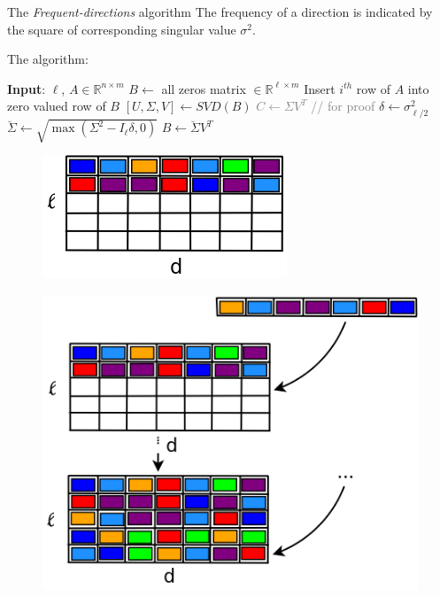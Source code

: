 \documentclass[first=dgreen,second=purple,logo=redque]{aaltoslides}
\begin{document}
\begin{frame}[allowframebreaks=1]{The \textit{Frequent-directions} algorithm}
The \textcolor{dgreen}{frequency} of a direction is indicated by the square of corresponding singular value $\sigma^2$.

\framebreak
The algorithm:
  \begin{algorithmic}
    \State \textbf{Input}: $\ell$, $A \in \mathbb{R}^{n\times m}$
    \State $B \leftarrow $ all zeros matrix $\in \mathbb{R}^{\ell\times m}$
    \State Insert $i^{th}$ row of $A$ into zero valued row of $B$
      \State $[U,\Sigma,V] \leftarrow SVD(B)$
      \textcolor{gray}{\State $C \leftarrow \Sigma V^T$ // for proof}
      \State $\delta \leftarrow \sigma_{\ell/2}^2$
      \State $\breve{\Sigma} \leftarrow \sqrt{\max(\Sigma^2-I_\ell\delta,0)}$
      \State $B\leftarrow \breve{\Sigma}V^T$
    \EndIf
    \EndFor
  \end{algorithmic}
  
\framebreak

\begin{figure}
  \includegraphics[scale=0.45]{plots/fd1}
 \label{fig:fd1}
\end{figure}

\framebreak

\begin{figure}
  \includegraphics[scale=0.35]{plots/fd2}
 \label{fig:fd2}
\end{figure}


\end{frame}
\end{document}
